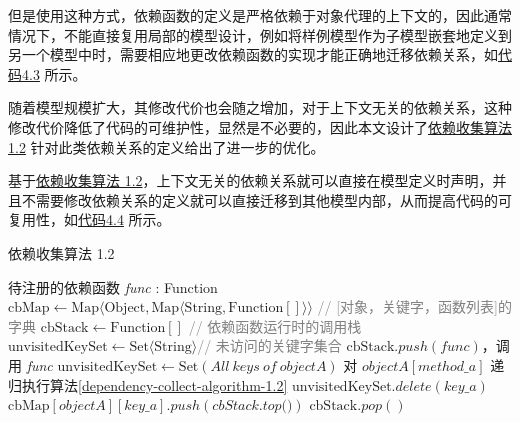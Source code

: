 \documentclass[winfonts,master,twoside]{njuthesis}
\begin{document}
但是使用这种方式，依赖函数的定义是严格依赖于对象代理的上下文的，因此通常情况下，不能直接复用局部的模型设计，例如将样例模型作为子模型嵌套地定义到另一个模型中时，需要相应地更改依赖函数的实现才能正确地迁移依赖关系，如\hyperref[reuse-reactive-data-model]{代码4.3} 所示。

随着模型规模扩大，其修改代价也会随之增加，对于上下文无关的依赖关系，这种修改代价降低了代码的可维护性，显然是不必要的，因此本文设计了\hyperref[dependency-collect-algorithm-1.2]{依赖收集算法 1.2} 针对此类依赖关系的定义给出了进一步的优化。

基于\hyperref[dependency-collect-algorithm-1.2]{依赖收集算法 1.2}，上下文无关的依赖关系就可以直接在模型定义时声明，并且不需要修改依赖关系的定义就可以直接迁移到其他模型内部，从而提高代码的可复用性，如\hyperref[reuse-reactive-data-model-without-modify]{代码4.4} 所示。

\begin{algorithm}[H]
    \caption{依赖收集算法 1.2}
    \label{dependency-collect-algorithm-1.2}
    \begin{algorithmic}[1]
        \REQUIRE 待注册的依赖函数 \textit{func} : Function
        \STATE $\text{cbMap} \gets \text{Map}\langle \text{Object}, \text{Map}\langle \text{String}, \text{Function}[]\rangle\rangle$ \footnotesize\textcolor{gray}{// [对象，关键字，函数列表]的字典}\normalsize
        \STATE $\text{cbStack} \gets \text{Function}[]$ \footnotesize\textcolor{gray}{// 依赖函数运行时的调用栈}\normalsize
        \STATE $\text{unvisitedKeySet} \gets \text{Set}\langle\text{String}\rangle$\footnotesize\textcolor{gray}{// 未访问的关键字集合}\normalsize
        \STATE $\text{cbStack}.push(\textit{func})$，调用 \textit{func}
        \STATE $\text{unvisitedKeySet} \gets \text{Set}(All\ keys\ of\ objectA)$
        \STATE 对 $objectA[method\_a]$ 递归执行算法\ref{dependency-collect-algorithm-1.2}
        \ENDIF
        \ENDIF
        \STATE $\text{unvisitedKeySet}.delete(key\_a)$
        \ENDIF
        \STATE $\text{cbMap}[objectA][key\_a].push(\textit{cbStack.top()})$
        \ENDIF
        \ENDIF
        \ENDWHILE
        \STATE $\text{cbStack}.pop()$
    \end{algorithmic}
\end{algorithm}
\end{document}
